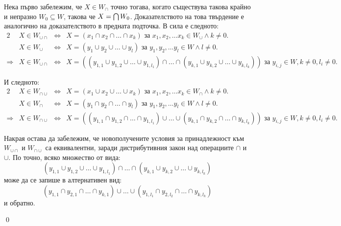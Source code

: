 \begin{problem}
\begin{enumerate}
\smallbreak
\quad
Нека първо забележим, че $X \in W_{\cap}$ точно тогава, когато съществува такова крайно и непразно $W_0 \subseteq W$, такова че $X = \bigcap{W_0}$.
Доказателството на това твърдение е аналогично на доказателството в предната подточка. В сила е следното:
\begin{alignat*}{2}
&X \in W_{\cup \cap} & \iff & X = (x_1 \cap x_2 \cap \dots \cap x_k) \text{ за } x_1, x_2, \dots x_k \in W_{\cup} \land k \neq 0. \\
&X \in W_{\cup}      & \iff & X = (y_1 \cup y_2 \cup \dots \cup y_l) \text{ за } y_1, y_2, \dots y_l \in W \land l \neq 0. \\
\hline
\Rightarrow {} &X \in W_{\cup \cap} & \iff & X = ((y_{1,1} \cup y_{1,2} \cup \dots \cup y_{1,l_1}) \cap \dots \cap (y_{k,1} \cup y_{k,2} \cup \dots \cup y_{k,l_k}))
\text{ за } y_{i, j} \in W, k \neq 0, l_i \neq 0.
\end{alignat*}

\quad
И следното:
\begin{alignat*}{2}
&X \in W_{\cap \cup} & \iff & X = (x_1 \cup x_2 \cup \dots \cup x_k) \text{ за } x_1, x_2, \dots x_k \in W_{\cap} \land k \neq 0. \\
&X \in W_{\cap}      & \iff & X = (y_1 \cap y_2 \cap \dots \cap y_l) \text{ за } y_1, y_2, \dots y_l \in W \land l \neq 0. \\
\hline
\Rightarrow {} &X \in W_{\cap \cup} & \iff & X = ((y_{1,1} \cap y_{1,2} \cap \dots \cap y_{1,l_1}) \cup \dots \cup (y_{k,1} \cap y_{k,2} \cap \dots \cap y_{k,l_k}))
\text{ за } y_{i,j} \in W, k \neq 0, l_i \neq 0.
\end{alignat*}

\quad
Накрая остава да забележим, че новополучените условия за принадлежност към $W_{\cup \cap}$ и $W_{\cap \cup}$ са еквивалентни,
заради дистрибутивния закон над операциите $\cap$ и $\cup$. По точно, всяко множество от вида:
\[
(y_{1,1} \cup y_{1,2} \cup \dots \cup y_{1,l_1}) \cap \dots \cap (y_{k,1} \cup y_{k,2} \cup \dots \cup y_{k,l_k})
\]
може да се запише в алтернативен вид:
\[
(y_{1,1} \cap y_{2,1} \cap \dots \cap y_{k,1}) \cup \dots \cup (y_{1,l_1} \cap y_{2,l_2} \cap \dots \cap y_{k,l_k})
\]
и обратно.

\qed

\end{enumerate}
\end{problem}
